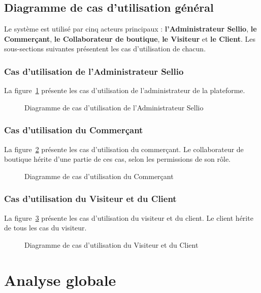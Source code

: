 \subsection{Diagramme de cas d'utilisation général}
Le système est utilisé par cinq acteurs principaux : \textbf{l'Administrateur Sellio}, \textbf{le Commerçant}, \textbf{le Collaborateur de boutique}, \textbf{le Visiteur} et \textbf{le Client}. Les sous-sections suivantes présentent les cas d'utilisation de chacun.

\subsubsection{Cas d'utilisation de l'Administrateur Sellio}
La figure~\ref{fig:cu-admin} présente les cas d'utilisation de l'administrateur de la plateforme.
\begin{figure}[H]
    \centering
    \caption{Diagramme de cas d'utilisation de l'Administrateur Sellio}
    \label{fig:cu-admin}
\end{figure}

\subsubsection{Cas d'utilisation du Commerçant}
La figure~\ref{fig:cu-commercant} présente les cas d'utilisation du commerçant. Le collaborateur de boutique hérite d'une partie de ces cas, selon les permissions de son rôle.
\begin{figure}[H]
    \centering
    \caption{Diagramme de cas d'utilisation du Commerçant}
    \label{fig:cu-commercant}
\end{figure}

\subsubsection{Cas d'utilisation du Visiteur et du Client}
La figure~\ref{fig:cu-client} présente les cas d'utilisation du visiteur et du client. Le client hérite de tous les cas du visiteur.
\begin{figure}[H]
    \centering
    \caption{Diagramme de cas d'utilisation du Visiteur et du Client}
    \label{fig:cu-client}
\end{figure}

\section{Analyse globale}
